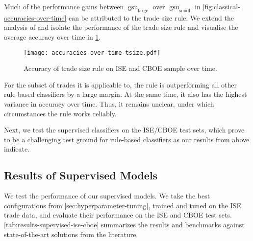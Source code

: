 Much of the performance gains between $\operatorname{gsu}_{\mathrm{large}}$ over $\operatorname{gsu}_{\mathrm{small}}$ in \cref{fig:classical-accuracies-over-time} can be attributed to the trade size rule. We extend the analysis of \textcite[][19]{grauerOptionTradeClassification2022} and isolate the performance of the trade size rule and visualise the average accuracy over time in \cref{fig:accuracies-over-time-tsize}.

\begin{figure}[!h]
    \centering
    \texttt{[image: accuracies-over-time-tsize.pdf]}
    \caption[Accuracy Over Trade Size Rule On  and  Over Time]{Accuracy of trade size rule on \gls{ISE} and \gls{CBOE} sample over time.}
    \label{fig:accuracies-over-time-tsize}
\end{figure}

For the subset of trades it is applicable to, the rule is outperforming all other rule-based classifiers by a large margin. At the same time, it also has the highest variance in accuracy over time. Thus, it remains unclear, under which circumstances the rule works reliably.

Next, we test the supervised classifiers on the \gls{ISE}/\gls{CBOE} test sets, which prove to be a challenging test ground for rule-based classifiers as our results from above indicate.

\subsection{Results of Supervised
    Models}\label{sec:results-of-supervised-models}

We test the performance of our supervised models. We take the best configurations from \cref{sec:hyperparameter-tuning}, trained and tuned on the \gls{ISE} trade data, and evaluate their performance on the \gls{ISE} and \gls{CBOE} test sets. \cref{tab:results-supervised-ise-cboe} summarizes the results and benchmarks against state-of-the-art solutions from the literature.

